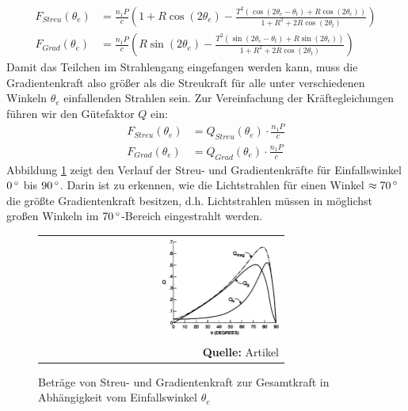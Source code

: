 \documentclass[a4paper,titlepage]{scrartcl}
\numberwithin{equation}{section}
\begin{document}
\begin{align*}
F_{Streu}(\theta_e)&=\frac{n_1 P}{c} \left( 1 + R \cos{(2 \theta_e)} - \frac{T^2 (\cos{(2 \theta_e - \theta_t)} + R \cos{(2 \theta_e)})}{1+R^2+2R\cos{(2 \theta_t)}} \right)\\
F_{Grad}(\theta_e)&=\frac{n_1 P}{c} \left( R \sin{(2 \theta_e)} - \frac{T^2 (\sin{(2 \theta_e-\theta_t)} + R \sin{(2 \theta_e)})}{1+R^2+2R\cos{(2 \theta_t)}} \right)
\end{align*}
Damit das Teilchen im Strahlengang eingefangen werden kann, muss die Gradientenkraft also größer als die Streukraft für alle unter verschiedenen Winkeln $\theta_e$ einfallenden Strahlen sein. Zur Vereinfachung der Kräftegleichungen führen wir den Gütefaktor $Q$ ein:
\begin{align*}
F_{Streu}(\theta_e)&=Q_{Streu}(\theta_e) \cdot \frac{n_1 P}{c}\\
F_{Grad}(\theta_e)&=Q_{Grad}(\theta_e) \cdot \frac{n_1 P}{c}
\end{align*}
Abbildung \ref{fig:guetefaktor} zeigt den Verlauf der Streu- und Gradientenkräfte für Einfallswinkel $\unit[0]{^\circ}$ bis $\unit[90]{^\circ}$. Darin ist zu erkennen, wie die Lichtstrahlen für einen Winkel $\approx \unit[70]{^\circ}$ die größte Gradientenkraft besitzen, d.h. Lichtstrahlen müssen in möglichst großen Winkeln im $\unit[70]{^\circ}$-Bereich eingestrahlt werden.
\begin{figure}[H]
	\centering
	\begin{tabular}{@{}r@{}}
		\includegraphics[width=0.5\textwidth]{images/guetefaktor.png}\\
		\footnotesize\sffamily\textbf{Quelle:} Artikel \cite{ashkin1992}
	\end{tabular}
	\caption{Beträge von Streu- und Gradientenkraft zur Gesamtkraft in Abhängigkeit vom Einfallswinkel $\theta_e$}
    \label{fig:guetefaktor}
\end{figure}
\end{document}
